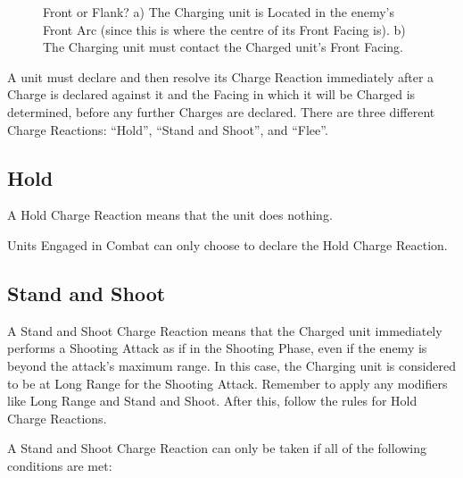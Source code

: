 \newcommand{\chargefrontageCharge}{\normalfontsize{\flufffont{Charge!}}}
\newcommand{\chargefrontageA}{a)}
\newcommand{\chargefrontageB}{b)}

\begin{figure}[!htbp]
	\begin{minipage}{0.52\textwidth}
	\renewcommand{\figbiglettersize}{21}
	\def\svgwidth{\textwidth}
	
	\end{minipage}\hfill\begin{minipage}{0.45\textwidth}
	\caption{Front or Flank?\captionpar
	a) The Charging unit is Located in the enemy's Front Arc (since this is where the centre of its Front Facing is).\captionpar
	b) The Charging unit must contact the Charged unit's Front Facing.}
	\label{figure/charge_frontage}
	\end{minipage}
\end{figure}

A unit must declare and then resolve its Charge Reaction immediately after a Charge is declared against it and the Facing in which it will be Charged is determined, before any further Charges are declared. There are three different Charge Reactions: \enquote{Hold}, \enquote{Stand and Shoot}, and \enquote{Flee}.

\subsection{Hold}

A Hold Charge Reaction means that the unit does nothing.

Units Engaged in Combat can only choose to declare the Hold Charge Reaction.

\subsection{Stand and Shoot}

A Stand and Shoot Charge Reaction means that the Charged unit immediately performs a Shooting Attack as if in the Shooting Phase, even if the enemy is beyond the attack's maximum range. In this case, the Charging unit is considered to be at Long Range for the Shooting Attack. Remember to apply any modifiers like Long Range and Stand and Shoot. After this, follow the rules for Hold Charge Reactions.

A Stand and Shoot Charge Reaction can only be taken if all of the following conditions are met:

